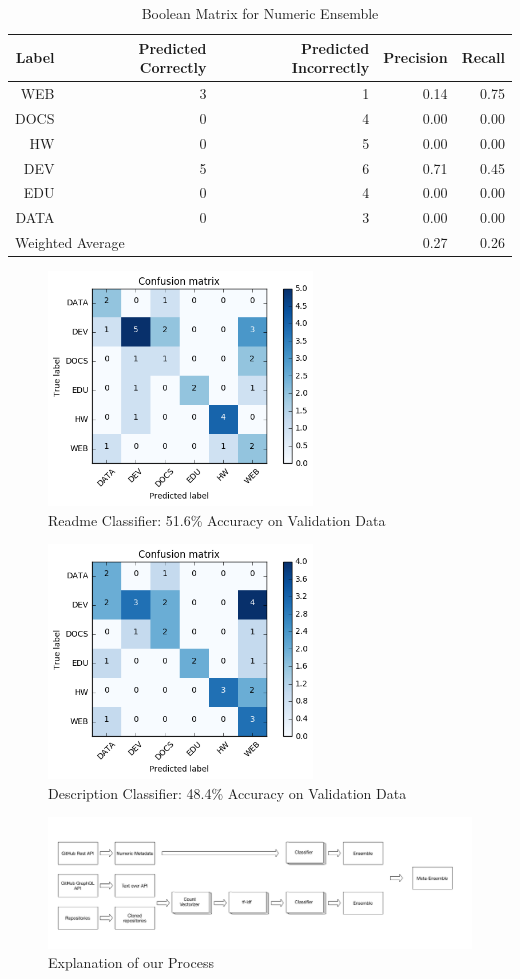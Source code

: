 \begin{table}[h]
\centering
\caption{Boolean Matrix for Numeric Ensemble}
\label{boolean_matrix_numeric_ensemble}
\begin{tabular}{|r|r|r|r|r|}
 \hline
 Label & Predicted Correctly & Predicted Incorrectly & Precision & Recall \\ \hline
 WEB & 3 & 1 & 0.14 & 0.75 \\ \hline
 DOCS & 0 & 4 & 0.00 & 0.00 \\ \hline
 HW & 0 & 5 & 0.00 & 0.00 \\ \hline
 DEV & 5 & 6 & 0.71 & 0.45 \\ \hline
 EDU & 0 & 4 & 0.00 & 0.00 \\ \hline
 DATA & 0 & 3 & 0.00 & 0.00 \\ \hline
 \multicolumn{3}{|l|}{Weighted Average} & 0.27 & 0.26 \\ \hline
 \end{tabular}
 \end{table}

\begin{figure}[h]
	\centering
		\includegraphics[width=7cm]{graphics/confusion-matrix-readme-classifier.png}
	\caption{Readme Classifier: 51.6\% Accuracy on Validation Data}
	\label{confusion-matrix-readme-classifier}
\end{figure}

\begin{figure}[h]
	\centering
		\includegraphics[width=7cm]{graphics/confusion-matrix-description-classifier.png}
	\caption{Description Classifier: 48.4\% Accuracy on Validation Data}
	\label{confusion-matrix-description-classifier}
\end{figure}

\begin{figure}[h]
	\centering
		\includegraphics[width=16cm]{graphics/process.png}
	\caption{Explanation of our Process}
	\label{process}
\end{figure}